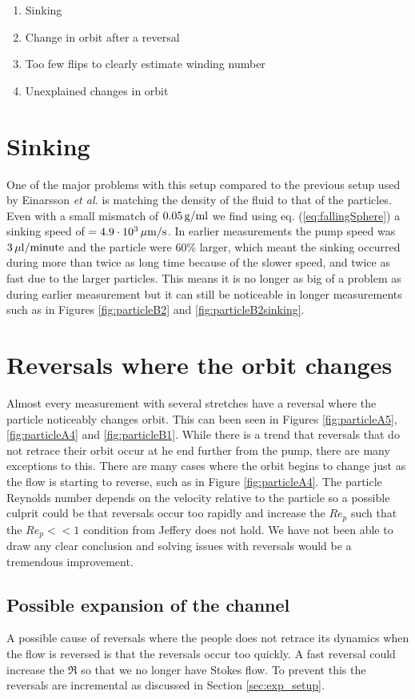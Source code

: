 \begin{enumerate}
\item Sinking
\item Change in orbit after a reversal
\item Too few flips to clearly estimate winding number
\item Unexplained changes in orbit 
\end{enumerate}

\section{Sinking}
One of the major problems with this setup compared to the previous setup used by Einarsson \emph{et al.} \cite{JonasExperiment} is matching the density of the fluid to that of the particles. Even with a small mismatch of $\unit[0.05]{g/ml}$ we find using eq. (\ref{eq:fallingSphere}) a sinking speed of $= \unit[4.9\cdot10^3 ]{\mu m/s}$. In earlier measurements the pump speed was $\unit[3]{\mu l/minute}$ and the particle were 60\% larger, which meant the sinking occurred during more than twice as long time because of the slower speed, and twice as fast due to the larger particles. This means it is no longer as big of a problem as during earlier measurement but it can still be noticeable in longer measurements such as in Figures \ref{fig:particleB2} and \ref{fig:particleB2sinking}. 

\section{Reversals where the orbit changes}
Almost every measurement with several stretches have a reversal where the particle noticeably changes orbit. This can been seen in Figures \ref{fig:particleA5}, \ref{fig:particleA4} and \ref{fig:particleB1}. While there is a trend that reversals that do not retrace their orbit occur at he end further from the pump, there are many exceptions to this. There are many cases where the orbit begins to change just as the flow is starting to reverse, such as in Figure \ref{fig:particleA4}. The particle Reynolds number depends on the velocity relative to the particle so a possible culprit could be that reversals occur too rapidly and increase the $Re_p$ such that the $Re_p << 1$ condition from Jeffery \cite{Jeffery} does not hold. We have not been able to draw any clear conclusion and solving issues with reversals would be a tremendous improvement.


\subsection{Possible expansion of the channel}
A possible cause of reversals where the people does not retrace its dynamics when the flow is reversed is that the reversals occur too quickly. A fast reversal could increase the $\Re$ so that we no longer have Stokes flow. To prevent this the reversals are incremental as discussed in Section \ref{sec:exp_setup}. 

